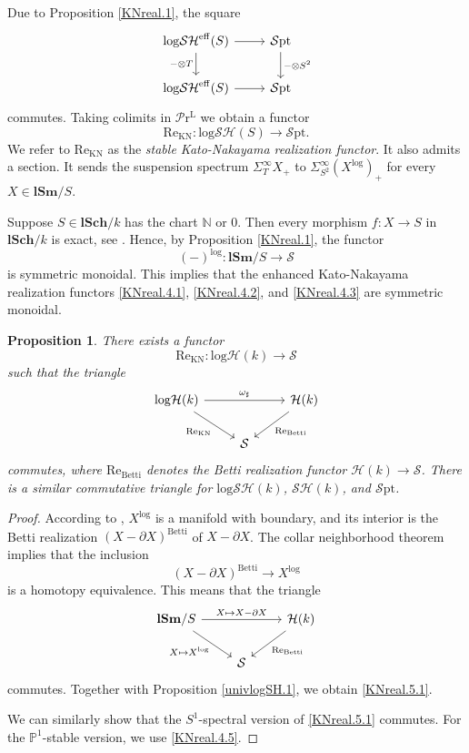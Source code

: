 \documentclass[11pt, a4paper]{amsart}
\newtheorem{prop}[thm]{Proposition}
\theoremstyle{definition}
\numberwithin{equation}{subsection}
\newcommand{\N}{\mathbb{N}}
\renewcommand{\P}{\mathbb{P}}
\newcommand{\lSch}{\mathbf{lSch}}
\newcommand{\lSm}{\mathbf{lSm}}
\newcommand{\Betti}{\mathrm{Betti}}
\newcommand{\Real}{\mathrm{Re}}
\newcommand{\eff}{{\rm eff}}
\newcommand{\infSpc}{\mathcal{S}}
\newcommand{\infSpt}{\mathcal{S}\mathrm{pt}}
\newcommand{\LPr}{\mathcal{P}\mathrm{r}^{\mathrm{L}}}
\newcommand{\infSH}{\mathcal{SH}}
\newcommand{\infH}{\mathcal{H}}
\newcommand{\inflogH}{\mathrm{log}\mathcal{H}}
\newcommand{\inflogSH}{\mathrm{log}\mathcal{SH}}
\begin{document}
\ 

Due to Proposition \ref{KNreal.1}, the square
\begin{equation}
\label{KNreal.4.5}
\begin{tikzcd}
\inflogSH^\eff(S)\ar[d,"-\otimes T"']\ar[r]&
\infSpt\ar[d,"-\otimes S^2"]
\\
\inflogSH^\eff(S)\ar[r]&
\infSpt
\end{tikzcd}
\end{equation}
commutes.
Taking colimits in $\LPr$ we obtain a functor
\begin{equation}
\label{KNreal.4.3}
\Real_{\mathrm{KN}}
\colon
\inflogSH(S)
\to
\infSpt.
\end{equation}
We refer to $\Real_{\mathrm{KN}}$ as the \emph{stable Kato-Nakayama realization functor}.
It also admits a section.
It sends the suspension spectrum $\Sigma_T^\infty X_+$ to $\Sigma_{S^2}^\infty (X^{\log})_+$ for every $X\in \lSm/S$.

Suppose $S\in \lSch/k$ has the chart $\N$ or $0$.
Then every morphism $f\colon X\to S$ in $\lSch/k$ is exact, see \cite[Proposition I.4.2.1(4)]{Ogu}.
Hence, by Proposition \ref{KNreal.1}, the functor
\[
(-)^{\log}
\colon
\lSm/S
\to
\infSpc
\]
is symmetric monoidal.
This implies that the enhanced Kato-Nakayama realization functors \eqref{KNreal.4.1}, \eqref{KNreal.4.2}, 
and \eqref{KNreal.4.3} are symmetric monoidal.

\begin{prop}
\label{KNreal.5}
There exists a functor
\[
\Real_\mathrm{KN}
\colon
\inflogH(k)
\to
\infSpc
\]
such that the triangle
\begin{equation}
\label{KNreal.5.1}
\begin{tikzcd}
\inflogH(k)\ar[rr,"\omega_\sharp"]\ar[rd,"\Real_{\mathrm{KN}}"']&
&
\infH(k)\ar[ld,"\Real_\Betti"]
\\
&
\infSpc
\end{tikzcd}
\end{equation}
commutes,
where $\Real_{\Betti}$\index[notation]{ReBetti @ $\Real_{\Betti}$} denotes the Betti realization functor 
$\infH(k)\to \infSpc$.
There is a similar commutative triangle for $\inflogSH(k)$, $\infSH(k)$, and $\infSpt$.
\end{prop}
\begin{proof}
According to \cite[Theorem V.1.3.1]{Ogu}, 
$X^{\log}$ is a manifold with boundary, 
and its interior is the Betti realization $(X-\partial X)^{\Betti}$ of $X-\partial X$.
The collar neighborhood theorem \cite[Theorem 2]{zbMATH03320239} implies that the inclusion
\[
(X-\partial X)^{\Betti}
\to
X^{\log}
\]
is a homotopy equivalence.
This means that the triangle
\[
\begin{tikzcd}
\lSm/S\ar[rr,"X\mapsto X-\partial X"]\ar[rd,"X\mapsto X^{\log}"']&
&
\infH(k)\ar[ld,"\Real_\Betti"]
\\
&
\infSpc
\end{tikzcd}
\]
commutes.
Together with Proposition \ref{univlogSH.1}, we obtain \eqref{KNreal.5.1}.

We can similarly show that the $S^1$-spectral version of \eqref{KNreal.5.1} commutes.
For the $\P^1$-stable version, 
we use \eqref{KNreal.4.5}.
\end{proof}
\end{document}
